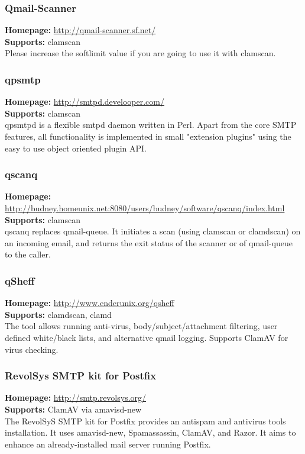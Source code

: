 \documentclass[a4paper,titlepage,12pt]{article}
\begin{document}
    \subsubsection{Qmail-Scanner}
    \textbf{Homepage:} \url{http://qmail-scanner.sf.net/}\\
    \textbf{Supports:} clamscan\\[4pt]
    Please increase the softlimit value if you are going to use it with
    clamscan.

    \subsubsection{qpsmtp}
    \textbf{Homepage:} \url{http://smtpd.develooper.com/}\\
    \textbf{Supports:} clamscan\\[4pt]
    qpsmtpd is a flexible smtpd daemon written in Perl. Apart from the core
    SMTP features, all functionality is implemented in small "extension plugins"
    using the easy to use object oriented plugin API.

    \subsubsection{qscanq}
    \textbf{Homepage:} \url{http://budney.homeunix.net:8080/users/budney/software/qscanq/index.html}\\
    \textbf{Supports:} clamscan\\[4pt]
    qscanq replaces qmail-queue. It initiates a scan (using clamscan or
    clamdscan) on an incoming email, and returns the exit status of the
    scanner or of qmail-queue to the caller.

    \subsubsection{qSheff}
    \textbf{Homepage:} \url{http://www.enderunix.org/qsheff}\\
    \textbf{Supports:} clamdscan, clamd\\[4pt]
    The tool allows running anti-virus, body/subject/attachment filtering, user 
    defined white/black lists, and alternative qmail logging. Supports ClamAV
    for virus checking.

    \subsubsection{RevolSys SMTP kit for Postfix}
    \textbf{Homepage:} \url{http://smtp.revolsys.org/}\\
    \textbf{Supports:} ClamAV via amavisd-new\\[4pt]
    The RevolSyS SMTP kit for Postfix provides an antispam and antivirus
    tools installation. It uses amavisd-new, Spamassassin, ClamAV, and Razor.
    It aims to enhance an already-installed mail server running Postfix.
\end{document}
